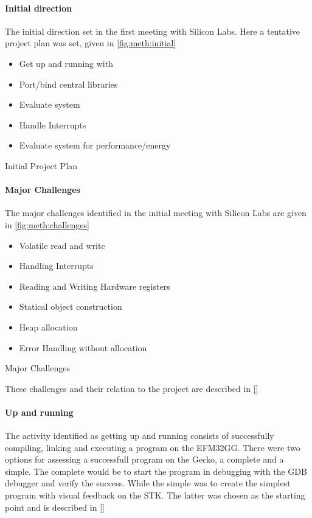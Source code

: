 \paragraph{Initial direction}
The initial direction set in the first meeting with Silicon Labs.
Here a tentative project plan was set, given in \autoref{fig:meth:initial}

\begin{listing}[H]
  \begin{itemize}
    \item Get up and running with \rust
    \item Port/bind central libraries
    \item Evaluate system
    \item Handle Interrupts
    \item Evaluate system for performance/energy
  \end{itemize}
  \caption{Initial Project Plan}
  \label{fig:meth:initial}
\end{listing}

\paragraph{Major Challenges}

The major challenges identified in the initial meeting with Silicon Labs are given in \autoref{fig:meth:challenges}

\begin{listing}[H]
  \begin{itemize}
    \item Volatile read and write
    \item Handling Interrupts
    \item Reading and Writing Hardware registers
    \item Statical object construction
    \item Heap allocation
    \item Error Handling without allocation
  \end{itemize}
  \caption{Major Challenges}
  \label{fig:meth:challenges}
\end{listing}

These challenges and their relation to the project are described in \autoref{} 

\paragraph{Up and running}
The activity identified as getting up and running consists of successfully compiling, linking and executing a \rust program on the EFM32GG.
There were two options for assessing a successfull program on the Gecko, a complete and a simple.
The complete would be to start the program in debugging with the GDB debugger and verify the success.
While the simple was to create the simplest program with visual feedback on the STK.
The latter was chosen as the starting point and is described in \autoref{} 

